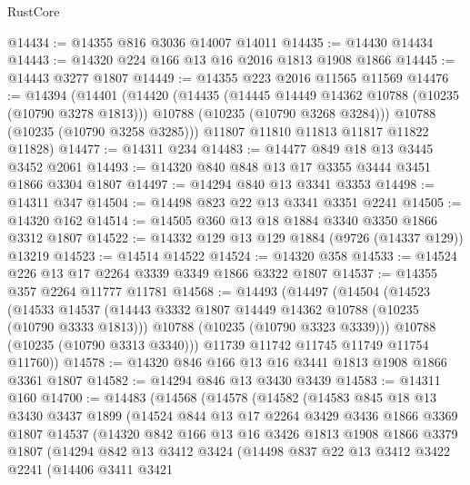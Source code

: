 \begin{lexlean}{RustCore}
\begin{coremodule}
@14434 := @14355 @816 @3036 @14007 @14011
@14435 := @14430 @14434
@14443 := @14320 @224 @166 @13 @16 @2016 @1813 @1908 @1866
@14445 := @14443 @3277 @1807
@14449 := @14355 @223 @2016 @11565 @11569
@14476 := @14394
    (@14401
      (@14420
        (@14435
          (@14445 @14449 @14362 @10788 (@10235 (@10790 @3278 @1813)))
          @10788
          (@10235 (@10790 @3268 @3284)))
        @10788
        (@10235 (@10790 @3258 @3285)))
      @11807
      @11810
      @11813
      @11817
      @11822
      @11828)
@14477 := @14311 @234
@14483 := @14477 @849 @18 @13 @3445 @3452 @2061
@14493 := @14320 @840 @848 @13 @17 @3355 @3444 @3451 @1866 @3304 @1807
@14497 := @14294 @840 @13 @3341 @3353
@14498 := @14311 @347
@14504 := @14498 @823 @22 @13 @3341 @3351 @2241
@14505 := @14320 @162
@14514 := @14505 @360 @13 @18 @1884 @3340 @3350 @1866 @3312 @1807
@14522 := @14332 @129 @13 @129 @1884 (@9726 (@14337 @129)) @13219
@14523 := @14514 @14522
@14524 := @14320 @358
@14533 := @14524 @226 @13 @17 @2264 @3339 @3349 @1866 @3322 @1807
@14537 := @14355 @357 @2264 @11777 @11781
@14568 := @14493
    (@14497
      (@14504
        (@14523
          (@14533
            @14537
            (@14443 @3332 @1807 @14449 @14362 @10788 (@10235 (@10790 @3333 @1813)))
            @10788
            (@10235 (@10790 @3323 @3339)))
          @10788
          (@10235 (@10790 @3313 @3340)))
        @11739
        @11742
        @11745
        @11749
        @11754
        @11760))
@14578 := @14320 @846 @166 @13 @16 @3441 @1813 @1908 @1866 @3361 @1807
@14582 := @14294 @846 @13 @3430 @3439
@14583 := @14311 @160
@14700 := @14483
    (@14568
      (@14578
        (@14582
          (@14583
            @845
            @18
            @13
            @3430
            @3437
            @1899
            (@14524
              @844
              @13
              @17
              @2264
              @3429
              @3436
              @1866
              @3369
              @1807
              @14537
              (@14320
                @842
                @166
                @13
                @16
                @3426
                @1813
                @1908
                @1866
                @3379
                @1807
                (@14294
                  @842
                  @13
                  @3412
                  @3424
                  (@14498
                    @837
                    @22
                    @13
                    @3412
                    @3422
                    @2241
                    (@14406
                      @3411
                      @3421

\end{coremodule}
\end{lexlean}
